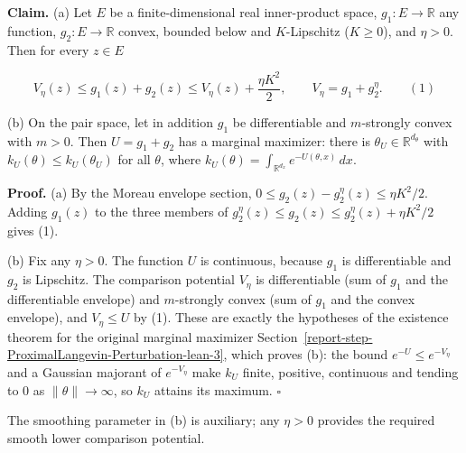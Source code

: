 \documentclass[11pt,a4paper]{report}
\begin{document}
\textbf{Claim.} (a) Let \(E\) be a finite-dimensional real inner-product space, \(g_1:E\to\mathbb R\) any function, \(g_2:E\to\mathbb R\) convex, bounded below and \(K\)-Lipschitz (\(K\ge0\)), and \(\eta>0\). Then for every \(z\in E\)


\[V_\eta(z)\le g_1(z)+g_2(z)\le V_\eta(z)+\frac{\eta K^2}{2},\qquad V_\eta=g_1+g_2^\eta.\qquad(1)\]


(b) On the pair space, let in addition \(g_1\) be differentiable and \(m\)-strongly convex with \(m>0\). Then \(U=g_1+g_2\) has a marginal maximizer: there is \(\theta_U\in\mathbb R^{d_\theta}\) with \(k_U(\theta)\le k_U(\theta_U)\) for all \(\theta\), where \(k_U(\theta)=\int_{\mathbb R^{d_x}}e^{-U(\theta,x)}\,dx\).




\textbf{Proof.} (a) By the Moreau envelope section, \(0\le g_2(z)-g_2^\eta(z)\le\eta K^2/2\). Adding \(g_1(z)\) to the three members of \(g_2^\eta(z)\le g_2(z)\le g_2^\eta(z)+\eta K^2/2\) gives (1).




(b) Fix any \(\eta>0\). The function \(U\) is continuous, because \(g_1\) is differentiable and \(g_2\) is Lipschitz. The comparison potential \(V_\eta\) is differentiable (sum of \(g_1\) and the differentiable envelope) and \(m\)-strongly convex (sum of \(g_1\) and the convex envelope), and \(V_\eta\le U\) by (1). These are exactly the hypotheses of the existence theorem for the original marginal maximizer Section~\ref{report-step-ProximalLangevin-Perturbation-lean-3}, which proves (b): the bound \(e^{-U}\le e^{-V_\eta}\) and a Gaussian majorant of \(e^{-V_\eta}\) make \(k_U\) finite, positive, continuous and tending to \(0\) as \(\|\theta\|\to\infty\), so \(k_U\) attains its maximum. \(\square\)




The smoothing parameter in (b) is auxiliary; any \(\eta>0\) provides the required smooth lower comparison potential.
\end{document}
